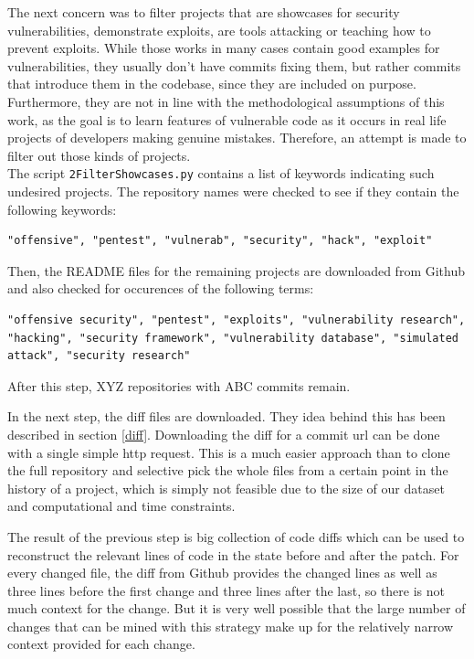 \documentclass[
	a4paper,
	pagesize,
	pdftex,
	12pt,
	twoside, %
	BCOR=5mm, %
	ngerman,
	fleqn,
	final,
	]{scrartcl}
\begin{document}
The next concern was to filter projects that are showcases for security vulnerabilities, demonstrate exploits, are tools attacking or teaching how to prevent exploits. While those works in many cases contain good examples for vulnerabilities, they usually don't have commits fixing them, but rather commits that introduce them in the codebase, since they are included on purpose. Furthermore, they are not in line with the methodological assumptions of this work, as the goal is to learn features of vulnerable code as it occurs in real life projects of developers making genuine mistakes. Therefore, an attempt is made to filter out those kinds of projects.\\
The script \texttt{2FilterShowcases.py} contains a list of keywords indicating such undesired projects. The repository names were checked to see if they contain the following keywords:
\begin{lstlisting}
"offensive", "pentest", "vulnerab", "security", "hack", "exploit"
\end{lstlisting}
Then, the README files for the remaining projects are downloaded from Github and also checked for occurences of the following terms:
\begin{lstlisting}
"offensive security", "pentest", "exploits", "vulnerability research", "hacking", "security framework", "vulnerability database", "simulated attack", "security research"
\end{lstlisting}
After this step, XYZ repositories with ABC commits remain.





In the next step, the diff files are downloaded. They idea behind this has been described in section \ref{diff}. Downloading the diff for a commit url can be done with a single simple http request. This is a much easier approach than to clone the full repository and selective pick the whole files from a certain point in the history of a project, which is simply not feasible due to the size of our dataset and computational and time constraints. 

The result of the previous step is big collection of code diffs which can be used to reconstruct the relevant lines of code in the state before and after the patch. For every changed file, the diff from Github provides the changed lines as well as three lines before the first change and three lines after the last, so there is not much context for the change. 
But it is very well possible that the large number of changes that can be mined with this strategy make up for the relatively narrow context provided for each change.
\end{document}
